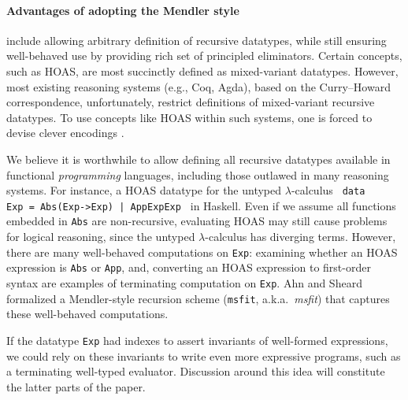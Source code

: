 \documentclass[a4paper]{easychair} %
\newcommand{\eg}[0]{{e.g.}}
\newcommand{\aka}[0]{{a.k.a.}}
\newcommand{\msfit}[0]{\texttt{msfit}}
\begin{document}
\paragraph{Advantages of adopting the Mendler style\!\!\!}
include allowing arbitrary definition of recursive datatypes, while still 
ensuring well-behaved use by providing rich set of principled eliminators.
Certain concepts, such as HOAS, are most succinctly defined as
mixed-variant datatypes. However, most existing reasoning systems
(\eg, Coq, Agda), based on the Curry--Howard correspondence, unfortunately,
restrict definitions of
mixed-variant recursive datatypes.
To use concepts like HOAS within such systems,
one is forced to devise clever encodings \cite{PHOAS}.

We believe it is worthwhile to allow defining all recursive datatypes
available in functional \emph{programming} languages, including those outlawed
in many reasoning systems. For instance, a HOAS datatype for
the untyped $\lambda$-calculus
{\small\texttt{\,data Exp~=~Abs\;(Exp\;->\;Exp)~|~App\;Exp\;Exp\,}} in Haskell.
Even if we assume all functions embedded in \texttt{Abs} are non-recursive,
evaluating HOAS may still cause problems for logical reasoning,
since the untyped $\lambda$-calculus has diverging terms. However, there are
many well-behaved computations on \texttt{Exp}: examining whether
an HOAS expression is \texttt{Abs} or \texttt{App}, and, converting an HOAS expression
to first-order syntax are examples of terminating computation on \texttt{Exp}.
Ahn and Sheard \cite{AhnShe11} formalized a Mendler-style recursion scheme
(\msfit, \aka\ \textit{msfit}) that captures these well-behaved computations.

If the datatype \texttt{Exp} had indexes to assert invariants of
well-formed expressions, we could rely on these invariants to write
even more expressive programs, such as a terminating well-typed evaluator.
Discussion around this idea will constitute the latter parts of the paper.
\vspace*{-1ex}
\end{document}
